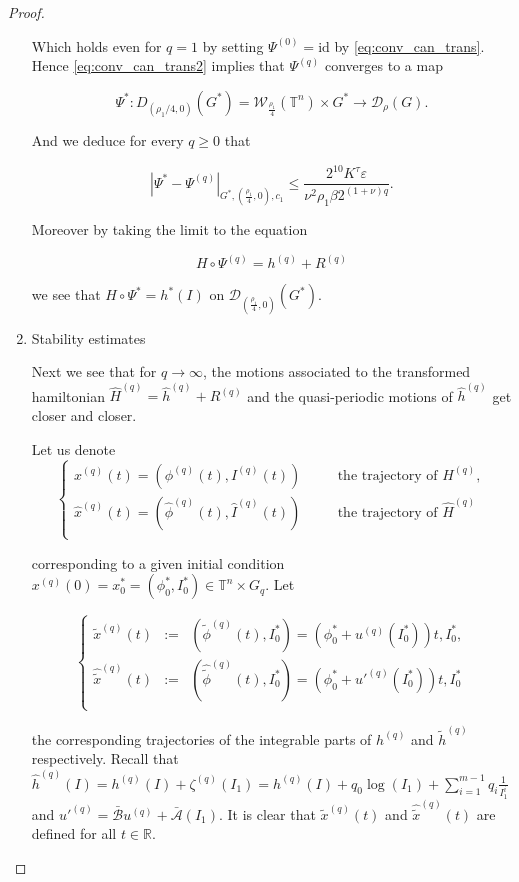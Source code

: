 \begin{proof}
\begin{enumerate}
Which holds even for $q=1$ by setting $\Psi^{(0)} = \text{id}$ by \ref{eq:conv_can_trans}. Hence \ref{eq:conv_can_trans2} implies that $\Psi^{(q)}$ converges to a map

$$\Psi^*: D_{(\rho_1/4, 0)}(G^*) = \mathcal{W}_{\frac{\rho_1}{4}}(\mathbb{T}^n)\times G^* \rightarrow \mathcal{D}_\rho(G).$$

And we deduce for every $q\geq 0$ that

$$|\Psi^* -\Psi^{(q)}|_{G^*,(\frac{\rho_1}{4},0),c_1} \leq \frac{2^10 K^\tau \varepsilon}{\nu^2 \rho_1 \beta 2^{(1+\nu)q}}.$$

Moreover by taking the limit to the equation

$$H\circ \Psi^{(q)} = h^{(q)} + R^{(q)}$$

we see that $H\circ \Psi^* = h^*(I)$ on $\mathcal{D}_{(\frac{\rho_1}{4},0)}(G^*)$.

\item Stability estimates

Next we see that for $q\rightarrow \infty$, the motions associated to the transformed hamiltonian $\hat H^{(q)} = \hat h^{(q)} + R^{(q)}$ and the quasi-periodic motions of $\hat h^{(q)}$ get closer and closer.

Let us denote
$$
\left\{
\begin{array}{rcl}
x^{(q)}(t) = ( \phi^{(q)}(t), I ^{(q)}(t)) & \quad & \text{the trajectory of }  H^{(q)},\\
\hat x^{(q)}(t) = (\hat \phi^{(q)}(t),\hat I ^{(q)}(t)) & \quad & \text{the trajectory of } \hat H^{(q)}\\
\end{array}
\right.
$$

corresponding to a given initial condition $x^{(q)}(0) = x_0^* = (\phi_0^*, I_0^* ) \in \mathbb{T}^n\times G_q$. Let

$$
\left\{
\begin{array}{rcl}
\tilde x^{(q)}(t) & := & (\tilde \phi^{(q)}(t), I_0^* ) = (\phi_0^*  + u^{(q)}(I_0^*))t, I_0^*,\\
\hat{ \tilde x}^{(q)}(t) & := &  (\hat{\tilde \phi}^{(q)}(t), I_0^* ) = (\phi_0^*  + u'^{(q)}(I_0^*))t, I_0^*\\
\end{array}
\right.
$$

the corresponding trajectories of the integrable parts of $h^{(q)}$ and $\tilde h^{(q)}$ respectively. Recall that $\hat h^{(q)}(I) = h^{(q)}(I) + \zeta^{(q)}(I_1) = h^{(q)}(I) + q_0 \log(I_1) + \sum_{i=1}^{m-1} q_i\frac{1}{I_1^i}$ and $u'^{(q)} = \bar{\mathcal{B}}u^{(q)}+ \bar{\mathcal{A}}(I_1)$. It is clear that $\tilde x^{(q)}(t)$ and $\hat{\tilde x}^{(q)}(t)$ are defined for all $t\in\mathbb{R}$.


\end{enumerate}
\end{proof}
